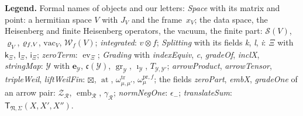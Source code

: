 \documentclass[11pt,a4paper]{article}
\newcommand{\m}[1]{\mbox{$#1$}}        %
\newcommand{\subhead}[1]{\par\addvspace{9pt plus 2pt}\Needspace{4\baselineskip}\noindent\textbf{#1}\enspace\ignorespaces}
\theoremstyle{plainx}
\theoremstyle{uprightx}
\newcommand{\cY}{\mathcal{Y}}
\newcommand{\cZ}{\mathcal{Z}}
\newcommand{\cR}{\mathcal{R}}
\newcommand{\Sch}[1]{\mathcal{S}(#1)}           %
\newcommand{\Wf}[1]{\mathcal{W}_f(#1)}          %
\newcommand{\rh}[1]{\varrho_{#1}}               %
\newcommand{\rhf}[1]{\varrho_{f\ifx\relax#1\relax\else,#1\fi}}   %
\newcommand{\vac}[1]{\mathrm{vac}_{#1}}         %
\newcommand{\ev}[1]{\operatorname{ev}_{#1}}     %
\newcommand{\gr}[1]{\operatorname{gr}_{#1}}     %
\newcommand{\Tm}[2]{T_{#1,#2}}                  %
\newcommand{\inX}[1]{\imath_{#1}}               %
\newcommand{\fc}[1]{\mathfrak{c}(#1)}           %
\newcommand{\tW}[2]{\omega^{\mathrm{tr}}_{#1,#2}}       %
\newcommand{\pWf}[1]{\omega^{\mathrm{pr},f}_{#1}}       %
\newcommand{\at}{\operatorname{at}}
\newcommand{\tsum}[5]{\mathsf{T}_{#4,#3}(#1,#2,#5)}    %
\newcommand{\epsm}{\epsilon_{-}}                        %
\begin{document}
\subhead{Legend.} Formal names of objects and our letters: \emph{Space} with its matrix and point: a hermitian
space $V$ with $J_V$ and the frame~$x_V$; the data space, the Heisenberg and finite Heisenberg operators, the
vacuum, the finite part: $\Sch{V}$, $\rh{V}$, $\rhf{V}$, $\vac{V}$, $\Wf{V}$; \emph{integrated}: \m{v\otimes f};
\emph{Splitting} with its fields \emph{k}, \emph{l}, \emph{i}: $\Xi$ with $\mathsf{k}_\Xi$, $\mathsf{l}_\Xi$,
$\mathsf{i}_\Xi$; \emph{zeroTerm}: $\ev{\Xi}$; \emph{Grading} with \emph{indexEquiv}, \emph{c}, \emph{gradeOf},
\emph{inclX}, \emph{stringMap}: $\cY$ with $\mathbf{e}_{\cY}$, $\fc{\cY}$, $\gr{\cY}$, $\inX{\cY}$, \m{\Tm{\cY}{\cY'}};
\emph{arrowProduct}, \emph{arrowTensor}, \emph{tripleWeil}, \emph{liftWeilFin}: $\boxtimes$, $\at$, \m{\tW{\mu}{\mu'}},
$\pWf{\mu}$; the fields \emph{zeroPart}, \emph{embX}, \emph{gradeOne} of an arrow pair: $\cZ_{\cR}$,
$\operatorname{emb}_{\cR}$, $\gamma_{\cR}$; \emph{normNegOne}: $\epsm$; \emph{translateSum}: \m{\tsum{X}{X'}{\Sigma}{\mathfrak{N}}{X''}}.
\end{document}
